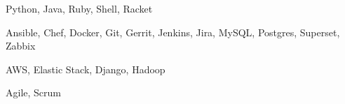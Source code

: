 \documentclass{resume}
\begin{document}
\smallskip


\begin{body}
\begin{description}[style=nextline,leftmargin=8em,topsep=1pt]
	\item[Languages] Python, Java, Ruby, Shell, Racket
	\item[Tools] Ansible, Chef, Docker, Git, Gerrit, Jenkins, Jira, MySQL, Postgres, Superset, Zabbix
	\item[Frameworks] AWS, Elastic Stack, Django, Hadoop
	\item[Methodologies] Agile, Scrum
\end{description}
\end{body}






%




\end{document}
